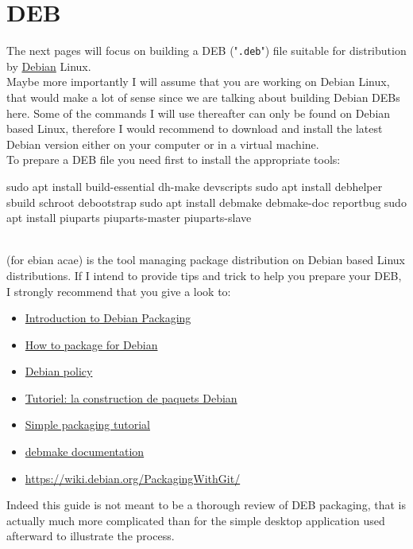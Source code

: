 \section{DEB}

\newcommand{\ddir}{"\bftt{debian}" directory}
\newcommand{\dpkg}{"\bftt{dpkg}" command}

The next pages will focus on building a DEB ("\texttt{.deb}") file suitable for distribution by \href{https://www.debian.org}{Debian} Linux. \\[0.25cm]
Maybe more importantly I will assume that you are working on Debian Linux, that would make
a lot of sense since we are talking about building Debian DEBs here. Some of the commands
I will use thereafter can only be found on Debian based Linux, therefore I would recommend to download
and install the latest Debian version either on your computer or in a virtual machine. \\[0.25cm]
To prepare a DEB file you need first to install the appropriate tools:
{\small{
\begin{script}
\uprompt{~} sudo apt install build-essential dh-make devscripts 
\uprompt{~} sudo apt install debhelper sbuild schroot debootstrap
\uprompt{~} sudo apt install debmake debmake-doc reportbug 
\uprompt{~} sudo apt install piuparts piuparts-master piuparts-slave
\end{script}
}}
\\[-0.25cm]
\noindent {} (for ebian acae) is the tool managing package distribution on Debian based Linux distributions. 
If I intend to provide tips and trick to help you prepare your DEB, I strongly recommend that you give a look to:
\begin{itemize}
\item \href{https://wiki.debian.org/Packaging/Intro?action=show\&redirect=IntroDebianPackaging}{Introduction to Debian Packaging}
\item \href{https://wiki.debian.org/HowToPackageForDebian}{How to package for Debian}
\item \href{https://www.debian.org/doc/debian-policy/}{Debian policy}
\item \href{https://www.debian.org/doc/manuals/packaging-tutorial/packaging-tutorial.fr.pdf}{Tutoriel: la construction de paquets Debian}
\item \href{https://wiki.debian.org/SimplePackagingTutorial}{Simple packaging tutorial}
\item \href{file://usr/share/doc/debmake-doc/debmake-doc.en.pdf}{debmake documentation}
\item \href{https://wiki.debian.org/PackagingWithGit/}{https://wiki.debian.org/PackagingWithGit/}
\end{itemize}
Indeed this guide is not meant to be a thorough review of DEB packaging, that is actually
much more complicated than for the simple desktop application used afterward to illustrate the process.

